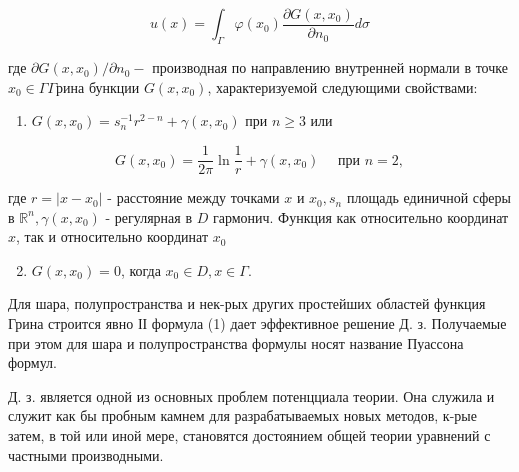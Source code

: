 \documentclass[10pt]{article}
\begin{document}
\[

u(x)=\int_{\Gamma} \varphi\left(x_{0}\right) \frac{\partial G\left(x, x_{0}\right)}{\partial n_{0}} d \sigma

\]



где $\partial G\left(x, x_{0}\right) / \partial n_{0}-$ производная по направлению внутренней нормали в точке $x_{0} \in \Gamma \Gamma р и н а$ бункции $G\left(x, x_{0}\right)$, характеризуемой следующими свойствами:



\begin{enumerate}

  \item $G\left(x, x_{0}\right)=s_{n}^{-1} r^{2-n}+\gamma\left(x, x_{0}\right)$ при $n \geqslant 3$ или

\end{enumerate}



\[

G\left(x, x_{0}\right)=\frac{1}{2 \pi} \ln \frac{1}{r}+\gamma\left(x, x_{0}\right) \quad \text { при } n=2,

\]



где $r=\left|x-x_{0}\right|$ - расстояние между точками $x$ и $x_{0}, s_{n}$ площадь единичной сферы в $\mathbb{R}^{n}, \gamma\left(x, x_{0}\right)$ - регулярная в $D$ гармонич. Функция как относительно координат $x$, так и относительно координат $x_{0}$



\begin{enumerate}

  \setcounter{enumi}{1}

  \item $G\left(x, x_{0}\right)=0$, когда $x_{0} \in D, x \in \Gamma$.

\end{enumerate}



Для шара, полупространства и нек-рых других простейших областей функция Грина строится явно ІІ формула (1) дает эффективное решение Д. з. Получаемые при этом для шара и полупространства формулы носят название Пуассона формул.



Д. з. является одной из основных проблем потенцциала теории. Она служила и служит как бы пробным камнем для разрабатываемых новых методов, к-рые затем, в той или иной мере, становятся достоянием общей теории уравнений с частными производными.
\end{document}
